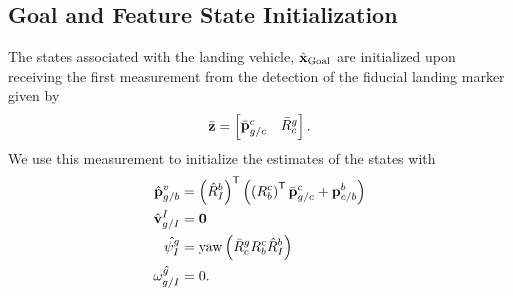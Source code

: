 
\subsection{Goal and Feature State Initialization}

The states associated with the landing vehicle, $\hat{\boldsymbol{\mathrm{x}}}_{\text{Goal}}$ are
initialized upon receiving the first measurement from
the detection of the fiducial landing marker given by
\begin{equation}
  \bar{\boldsymbol{\mathrm{z}}} =
  \begin{bmatrix}
    \bar{\boldsymbol{\mathrm{p}}}_{g/c}^c & \bar{R}_c^g
  \end{bmatrix}.
  \label{eq:fiducial_meas}
\end{equation}
We use this measurement to initialize the estimates of the states with
\begin{align}
  \hat{\boldsymbol{\mathrm{p}}}_{g/b}^v &= \left( \hat{R}_I^b \right)^{\mathsf{T}} \left( \left ( R_b^c
  \right)^{\mathsf{T}} \bar{\boldsymbol{\mathrm{p}}}_{g/c}^c + \boldsymbol{\mathrm{p}}_{c/b}^b
\right)   \\
      \hat{\boldsymbol{\mathrm{v}}}_{g/I}^I &= \boldsymbol{\mathrm{0}} \\
      \hat{\psi_I^g} &= \text{yaw} \left( \bar{R}_c^g R_b^c \hat{R}_I^b \right)
      \\
      \hat{\omega_{g/I}^g} &= 0.
\end{align}


